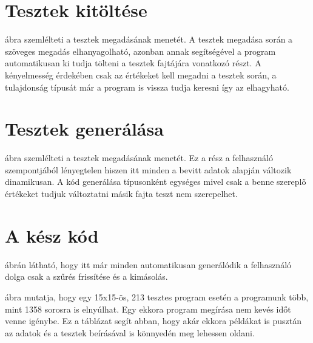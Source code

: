 \documentclass[12pt,a4paper,oneside]{report}
\begin{document}

\section{Tesztek kitöltése}

 ábra szemlélteti a tesztek megadásának menetét.
A tesztek megadása során a szöveges megadás elhanyagolható, azonban annak segítségével a program automatikusan ki tudja tölteni a tesztek fajtájára vonatkozó részt.
A kényelmesség érdekében csak az értékeket kell megadni a tesztek során, a tulajdonság típusát már a program is vissza tudja keresni így az elhagyható.


\section{Tesztek generálása}

 ábra szemlélteti a tesztek megadásának menetét.
Ez a rész a felhasználó szempontjából lényegtelen hiszen itt minden a bevitt adatok alapján változik dinamikusan.
A kód generálása típusonként egységes mivel csak a benne szereplő értékeket tudjuk változtatni másik fajta teszt nem szerepelhet.


\section{A kész kód}

 ábrán látható, hogy itt már minden automatikusan generálódik a felhasználó dolga csak a szűrés frissítése és a kimásolás.

 ábra mutatja, hogy egy 15x15-ös, 213 tesztes program esetén a programunk több, mint 1358 sorosra is elnyúlhat.
Egy ekkora program megírása nem kevés időt venne igénybe.
Ez a táblázat segít abban, hogy akár ekkora példákat is pusztán az adatok és a tesztek beírásával is könnyedén meg lehessen oldani.

\end{document}

